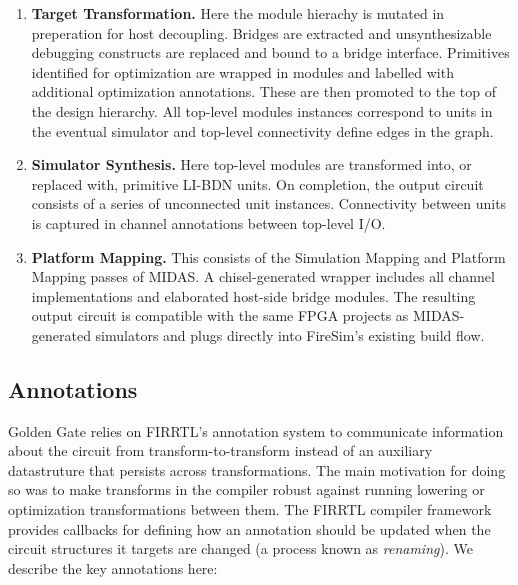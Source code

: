 \begin{enumerate}

\item \textbf{Target Transformation.} Here the
module hierachy is mutated in preperation for host decoupling. Bridges are
extracted and unsynthesizable debugging constructs are replaced and
bound to a bridge interface. Primitives identified for optimization are
wrapped in modules and labelled with additional optimization annotations. These are then promoted to the top of the design hierarchy. 
All top-level modules instances correspond to units in the eventual
simulator and top-level connectivity define edges in the graph.

\item \textbf{Simulator Synthesis.} Here top-level modules are transformed
into, or replaced with, primitive LI-BDN units. On completion, the output circuit consists of a
series of unconnected unit instances. Connectivity between units is captured in
channel annotations between top-level I/O.

\item \textbf{Platform Mapping.} This consists of the Simulation Mapping and
Platform Mapping passes of MIDAS. A chisel-generated wrapper includes all
channel implementations and elaborated host-side bridge modules. The resulting output
circuit is compatible with the same FPGA projects as MIDAS-generated
simulators and plugs directly into FireSim's existing build flow.
\end{enumerate}

\subsection{Annotations}
Golden Gate relies on FIRRTL's annotation system to communicate information about the
circuit from transform-to-transform instead of an auxiliary
datastruture that persists across transformations. The main motivation for doing so was to make transforms in the
compiler robust against running lowering or optimization transformations
between them. The FIRRTL compiler framework provides callbacks for defining
how an annotation should be updated when the circuit structures it targets are
changed (a process known as \emph{renaming}). We describe the key annotations here:

